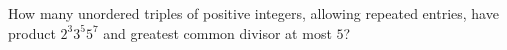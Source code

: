 How many unordered triples of positive integers, allowing repeated entries, have product $2^3 3^5 5^7$ and greatest common divisor at most $5$?
